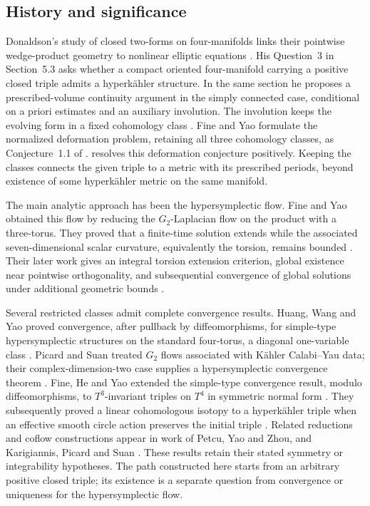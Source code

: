 \subsection{History and significance}

Donaldson's study of closed two-forms on four-manifolds links their
pointwise wedge-product geometry to nonlinear elliptic equations
\cite{Donaldson2006}. His Question~3 in Section~5.3 asks whether a
compact oriented four-manifold carrying a positive closed triple
admits a hyperk\"ahler structure. In the same section he proposes a
prescribed-volume continuity argument in the simply connected case,
conditional on a priori estimates and an auxiliary involution. The
involution keeps the evolving form in a fixed cohomology class
\cite[Section~5.3]{Donaldson2006}.
Fine and Yao formulate the normalized
deformation problem, retaining all three cohomology classes, as
Conjecture~1.1 of \cite{FineYao2017}.
 resolves this deformation conjecture positively.
Keeping the classes connects the given triple to a metric with its
prescribed periods, beyond existence of some hyperk\"ahler metric on
the same manifold.

The main analytic approach has been the hypersymplectic flow.
Fine and Yao obtained this flow by reducing the $G_2$-Laplacian flow
on the product with a three-torus. They proved that a finite-time
solution extends while the associated seven-dimensional scalar
curvature, equivalently the torsion, remains bounded
\cite[Theorem~1.3]{FineYao2017}. Their later work gives an integral
torsion extension criterion, global existence near pointwise
orthogonality, and subsequential convergence of global solutions under
additional geometric bounds
\cite[Theorems~4.7, 4.10, 4.15 and~4.16]{FineYao2020}.

Several restricted classes admit complete convergence results.
Huang, Wang and Yao proved convergence, after pullback by
diffeomorphisms, for simple-type hypersymplectic structures on
the standard four-torus, a diagonal one-variable class
\cite[Theorems~3.5 and~3.6]{HuangWangYao2018}.
Picard and Suan treated $G_2$ flows associated with K\"ahler
Calabi--Yau data; their complex-dimension-two case supplies a
hypersymplectic convergence theorem
\cite[Theorem~1.3]{PicardSuan2024}.
Fine, He and Yao extended the simple-type convergence result, modulo
diffeomorphisms, to
$T^3$-invariant triples on $T^4$ in symmetric normal form
\cite[Theorem~1.5]{FineHeYao2024}. They subsequently proved
a linear cohomologous isotopy to a hyperk\"ahler triple when an
effective smooth circle action preserves the initial triple
\cite[Theorem~1.2]{FineHeYao2025}.
Related reductions and coflow constructions appear in work of Petcu,
Yao and Zhou, and Karigiannis, Picard and Suan
\cite{Petcu2026,YaoZhou2026,KarigiannisPicardSuan2026}.
These results retain their stated symmetry or integrability hypotheses.
The path constructed here starts from an arbitrary positive closed
triple; its existence is a separate question from convergence or
uniqueness for the hypersymplectic flow.


